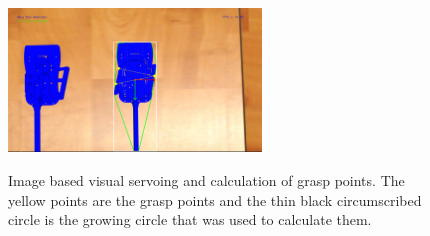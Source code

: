 \begin{center}
\begin{figure}[!htb]
\centering
\includegraphics[width=0.6\textwidth]{images/grasp-points-triangle.png}\\
\caption{Image based visual servoing and calculation of grasp points. The yellow points are the grasp points and the thin black circumscribed circle is the growing circle that was used to calculate them.}
\end{figure}
\end{center}



